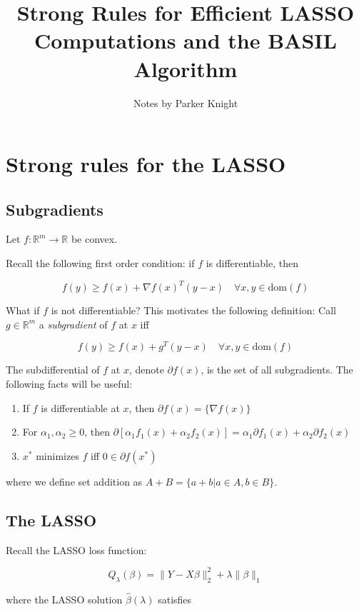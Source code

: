 \documentclass{amsart}
\title{Strong Rules for Efficient LASSO Computations and the BASIL Algorithm}
\author{Notes by Parker Knight}
\newcommand{\R}{\mathbb{R}}
\newcommand{\dom}{\textrm{dom}}
\begin{document}
\maketitle

\section{Strong rules for the LASSO}

\subsection{Subgradients}

Let $f: \R^m \rightarrow \R$ be convex.

\bigskip

Recall the following first order condition: if $f$ is differentiable, then 

$$f(y) \geq f(x) + \nabla f(x)^T(y - x) \quad \forall x, y \in \dom(f)$$

What if $f$ is not differentiable? This motivates the following definition: Call
$g \in \R^m$ a \textit{subgradient} of $f$ at $x$ iff

$$f(y) \geq f(x) + g^T(y - x) \quad \forall x, y \in \dom(f)$$

The subdifferential of $f$ at $x$, denote $\partial f(x)$, is the set of all
subgradients. The following facts will be useful:

\begin{enumerate}
	\item If $f$ is differentiable at $x$, then $\partial f(x) = \{\nabla f(x) \}$
	\item For $\alpha_1, \alpha_2 \geq 0$, then $\partial \left[
	\alpha_1 f_1(x) + \alpha_2 f_2(x) \right] = \alpha_1 \partial f_1(x) +
	\alpha_2 \partial f_2(x)$
	\item $x^*$ minimizes $f$ iff $0 \in \partial f(x^*)$
\end{enumerate}

where we define set addition as $A + B = \{a + b | a \in A, b \in B \}$. 
\subsection{The LASSO}

Recall the LASSO loss function:

$$Q_{\lambda}(\beta) = \|Y - X\beta \|_2^2 + \lambda \|\beta \|_1$$

where the LASSO solution $\hat{\beta}(\lambda)$ satisfies
\end{document}
